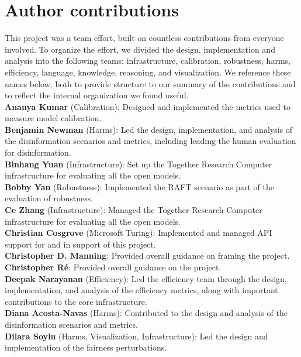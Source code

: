 \hypertarget{author-contributions}{\section{Author contributions}}
\label{app:contributions}
This project was a team effort, built on countless contributions from everyone involved. 
To organize the effort, we divided the design, implementation and analysis into the following teams: 
infrastructure, 
calibration,
robustness,
harms,
efficiency,
language,
knowledge,
reasoning,
and
visualization.
We reference these names below, both to provide structure to our summary of the contributions and to reflect the internal organization we found useful. \\

\noindent 
\textbf{Ananya Kumar} (Calibration): Designed and implemented the metrics used to measure model calibration. \\
\textbf{Benjamin Newman} (Harms): Led the design, implementation, and analysis of the disinformation scenarios and metrics, including leading the human evaluation for disinformation. \\ 
\textbf{Binhang Yuan} (Infrastructure): Set up the Together Research Computer infrastructure for evaluating all the open models. \\ 
\textbf{Bobby Yan} (Robustness): Implemented the RAFT scenario as part of the evaluation of robustness.\\ 
\textbf{Ce Zhang} (Infrastructure): Managed the Together Research Computer infrastructure for evaluating all the open models.\\ \textbf{Christian Cosgrove} (Microsoft Turing): Implemented and managed API support for \mtnlgseven and \mtnlgfivethreezero in support of this project. \\
\textbf{Christopher D. Manning}: Provided overall guidance on framing the project.\\ 
\textbf{Christopher R\'{e}}: Provided overall guidance on the project.\\ 
\textbf{Deepak Narayanan} (Efficiency): Led the efficiency team through the design, implementation, and analysis of the efficiency metrics, along with important contributions to the core infrastructure. \\ 
\textbf{Diana Acosta-Navas} (Harms): Contributed to the design and analysis of the disinformation scenarios and metrics. \\ 
\textbf{Dilara Soylu} (Harms, Visualization, Infrastructure): Led the design and implementation of the fairness perturbations. 
